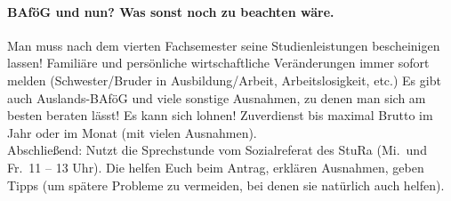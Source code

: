 \paragraph{BAföG und nun? Was sonst noch zu beachten wäre.}
Man muss nach dem vierten Fachsemester seine Studienleistungen bescheinigen lassen!
Familiäre und persönliche wirtschaftliche Veränderungen immer sofort melden (Schwester/Bruder in Ausbildung/Arbeit, Arbeitslosigkeit, etc.)
Es gibt auch Auslands-BAföG und viele sonstige Ausnahmen, zu denen man sich am besten beraten lässt! Es kann sich lohnen!
Zuverdienst bis maximal  Brutto im Jahr oder  im Monat (mit vielen Ausnahmen).\\[5mm]

\noindent Abschließend: Nutzt die Sprechstunde vom Sozialreferat des \gls{StuRa} (Mi.\ und Fr.\ 11 -- 13 Uhr). Die helfen Euch beim Antrag, erklären Ausnahmen, geben Tipps (um spätere Probleme zu vermeiden, bei denen sie natürlich auch helfen).
